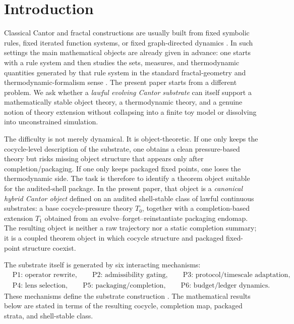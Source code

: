\documentclass[11pt]{article}
\theoremstyle{definition}
\begin{document}
 \section{Introduction}

Classical Cantor and fractal constructions are usually built from fixed symbolic rules, fixed iterated function systems, or fixed graph-directed dynamics \cite{Hutchinson1981Fractals,Moran1946AdditiveFunctions,MauldinUrbanskiGDMS}. In such settings the main mathematical objects are already given in advance: one starts with a rule system and then studies the sets, measures, and thermodynamic quantities generated by that rule system in the standard fractal-geometry and thermodynamic-formalism sense \cite{FalconerFractalGeometry,Bowen1979Quasicircles,Ruelle1978ThermodynamicFormalism,WaltersErgodic1982}. The present paper starts from a different problem. We ask whether a \emph{lawful evolving Cantor substrate} can itself support a mathematically stable object theory, a thermodynamic theory, and a genuine notion of theory extension without collapsing into a finite toy model or dissolving into unconstrained simulation.

The difficulty is not merely dynamical. It is object-theoretic. If one only keeps the cocycle-level description of the substrate, one obtains a clean pressure-based theory but risks missing object structure that appears only after completion/packaging. If one only keeps packaged fixed points, one loses the thermodynamic side. The task is therefore to identify a theorem object suitable for the audited-shell package. In the present paper, that object is a \emph{canonical hybrid Cantor object} defined on an audited shell-stable class of lawful continuous substrates: a base cocycle-pressure theory \(T_0\), together with a completion-based extension \(T_1\) obtained from an evolve--forget--reinstantiate packaging endomap. The resulting object is neither a raw trajectory nor a static completion summary; it is a coupled theorem object in which cocycle structure and packaged fixed-point structure coexist.

The substrate itself is generated by six interacting mechanisms:
\[
\begin{aligned}
&\text{P1: operator rewrite},\qquad
\text{P2: admissibility gating},\qquad
\text{P3: protocol/timescale adaptation},\\
&\text{P4: lens selection},\qquad
\text{P5: packaging/completion},\qquad
\text{P6: budget/ledger dynamics}.
\end{aligned}
\]
These mechanisms define the substrate construction \cite{TsiokosFoundations}. The mathematical results below are stated in terms of the resulting cocycle, completion map, packaged strata, and shell-stable class.
\end{document}
